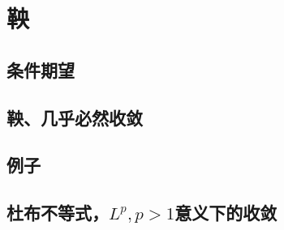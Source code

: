\documentclass[../main.tex]{subfiles}
\begin{document}
\chapter{鞅}
\section{条件期望}
\section{鞅、几乎必然收敛}
\section{例子}
\section{杜布不等式，\texorpdfstring{\(L^p,p>1\)}{L\^p, p>1}意义下的收敛}
\section{}
\section{}
\section{}
\section{}
\section{}
\end{document}
